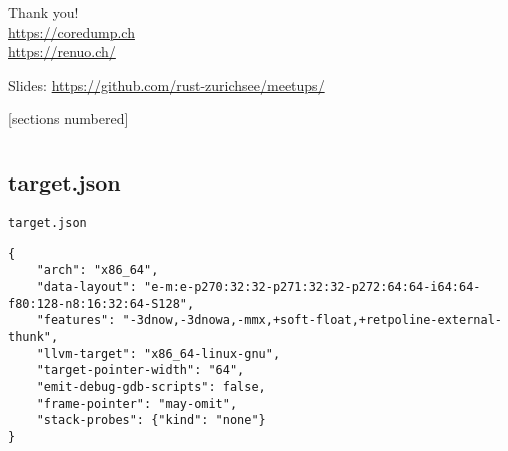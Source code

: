 \documentclass[aspectratio=1610,14pt,t]{beamer}
\begin{document}
{
\begin{frame}[standout]
  \begin{centering}
    {\Huge Thank you!}\\
    {\normalsize \url{https://coredump.ch}}\\
    {\normalsize \url{https://renuo.ch/}}\\
  \end{centering}
  {\small Slides: \url{https://github.com/rust-zurichsee/meetups/}}\\
  \vspace{3cm}
\end{frame}
}


[sections numbered]
\appendix
\section{\appendixname}
\frame{\tableofcontents}

\subsection{target.json}


\begin{frame}[c,fragile]{\texttt{target.json}}
  \begin{verbatim}
{
    "arch": "x86_64",
    "data-layout": "e-m:e-p270:32:32-p271:32:32-p272:64:64-i64:64-f80:128-n8:16:32:64-S128",
    "features": "-3dnow,-3dnowa,-mmx,+soft-float,+retpoline-external-thunk",
    "llvm-target": "x86_64-linux-gnu",
    "target-pointer-width": "64",
    "emit-debug-gdb-scripts": false,
    "frame-pointer": "may-omit",
    "stack-probes": {"kind": "none"}
}
  \end{verbatim}
\end{frame}
\end{document}
